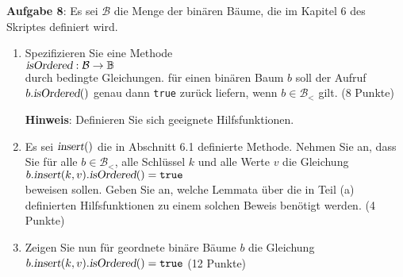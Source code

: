 \documentclass{article}
\begin{document}
\noindent
\textbf{Aufgabe 8}:
Es sei $\mathcal{B}$ die Menge der bin\"aren B\"aume, die im Kapitel 6 des
Skriptes definiert wird.  
\begin{enumerate}
\item Spezifizieren Sie eine Methode \\[0.2cm]
      \hspace*{1.3cm}
      $\textsl{isOrdered}: \mathcal{B} \rightarrow \mathbb{B}$
      \\[0.2cm]
      durch bedingte Gleichungen.  f\"ur einen bin\"aren Baum $b$ soll der Aufruf
      $b.\textsl{isOrdered}()$ genau dann \texttt{true} zur\"uck liefern, wenn $b\in \mathcal{B}_<$
      gilt.
      \hspace*{\fill} (8 Punkte)

      \textbf{Hinweis}: Definieren Sie sich geeignete Hilfsfunktionen.
\item Es sei $\textsl{insert}()$ die in Abschnitt 6.1 definierte Methode.
      Nehmen Sie an, dass Sie f\"ur alle $b\in \mathcal{B}_<$, alle Schl\"ussel $k$ und alle Werte
      $v$ die Gleichung
      \\[0.2cm]
      \hspace*{1.3cm} $b.\textsl{insert}(k,v).\textsl{isOrdered}() = \texttt{true}$
      \\[0.2cm]
      beweisen sollen.  Geben Sie an, welche Lemmata \"uber die in Teil (a) definierten
      Hilfsfunktionen zu einem solchen Beweis ben\"otigt werden.
      \hspace*{\fill} (4 Punkte)
\item Zeigen Sie nun f\"ur geordnete bin\"are B\"aume $b$ die Gleichung
      \\[0.2cm]
      \hspace*{1.3cm} $b.\textsl{insert}(k,v).\textsl{isOrdered}() = \texttt{true}$
      \hspace*{\fill} (12 Punkte)
\end{enumerate}
\end{document}
